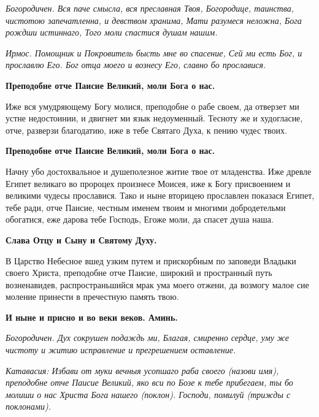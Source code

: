 \itshape Богородичен.\normalfont{} Вся паче смысла, вся преславная Твоя, Богородице, таинства, чистотою запечатленна, и девством хранима, Мати разумеся неложна, Бога рождши истиннаго, Того моли спастися душам нашим.








\itshape Ирмос.\normalfont{} Помощник и Покровитель бысть мне во спасение, Сей ми есть Бог, и прославлю Его. Бог отца моего и вознесу Его, славно бо прославися.




\bfseries Преподобне отче Паисие Великий, моли Бога о нас.\normalfont{}




Иже вся умудряющему Богу молися, преподобне о рабе своем, да отверзет ми устне недостоинии, и двигнет ми язык недоуменный. Тесноту же и худогласие, отче, разверзи благодатию, иже в тебе Святаго Духа, к пению чудес твоих.




\bfseries Преподобне отче Паисие Великий, моли Бога о нас.\normalfont{}




Начну убо достохвальное и душеполезное житие твое от младенства. Иже древле Египет великаго во пророцех произнесе Моисея, иже к Богу присвоением и великими чудесы прославися. Тако и ныне вторицею прославлен показася Египет, тебе ради, отче Паисие, честным именем твоим и многими добродетельми обогатися, еже дарова тебе Господь, Егоже моли, да спасет душа наша. 




\bfseries Слава Отцу и Сыну и Святому Духу.\normalfont{}




В Царство Небесное вшед узким путем и прискорбным по заповеди Владыки своего Христа, преподобне отче Паисие, широкий и пространный путь
возненавидев, распространьшийся мрак ума моего отжени, да возмогу малое сие моление принести в пречестную память твою. 




\bfseries И ныне и присно и во веки веков. Аминь.\normalfont{}




\itshape Богородичен.\normalfont{} Дух сокрушен подаждь ми, Благая, смиренно сердце, уму же чистоту и житию исправление и прегрешением оставление. 




\itshape Катавасия:\normalfont{} Избави от муки вечныя усопшаго раба своего \itshape (назови имя)\normalfont{}, преподобне отче Паисие Великий, яко вси по Бозе к тебе прибегаем, ты бо молиши о нас Христа Бога нашего (\itshape поклон\normalfont{}). Господи, помилуй (\itshape трижды с поклонами\normalfont{}).




